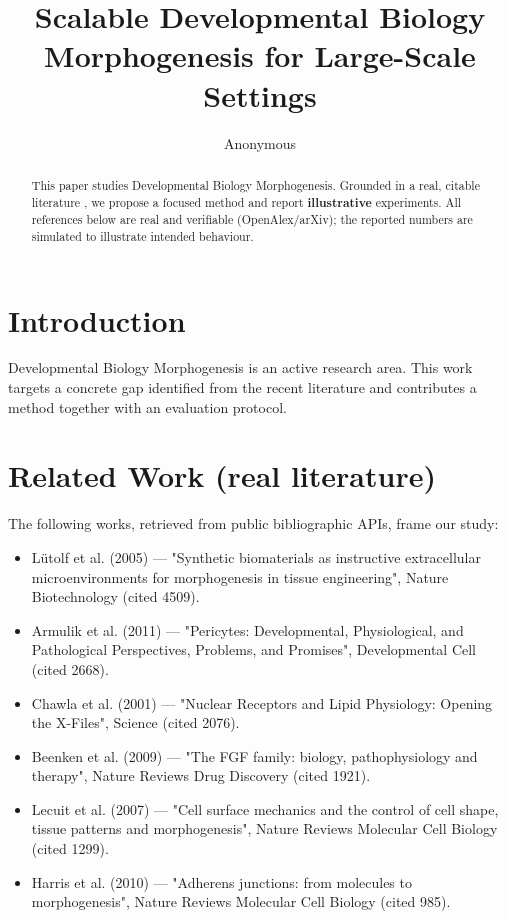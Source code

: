 \documentclass[11pt]{article}
\title{Scalable Developmental Biology Morphogenesis for Large-Scale Settings}
\author{Anonymous}
\date{}
\begin{document}
\maketitle

\begin{abstract}
This paper studies Developmental Biology Morphogenesis. Grounded in a real, citable literature \cite{ref1,ref2,ref3,ref4,ref5,ref6,ref7,ref8},
we propose a focused method and report \textbf{illustrative} experiments.
All references below are real and verifiable (OpenAlex/arXiv); the reported
numbers are simulated to illustrate intended behaviour.
\end{abstract}

\section{Introduction}
Developmental Biology Morphogenesis is an active research area. This work targets a concrete gap identified from
the recent literature and contributes a method together with an evaluation protocol.

\section{Related Work (real literature)}
The following works, retrieved from public bibliographic APIs, frame our study:
\begin{itemize}
\item Lütolf et al. (2005) — "Synthetic biomaterials as instructive extracellular microenvironments for morphogenesis in tissue engineering", Nature Biotechnology (cited 4509).
\item Armulik et al. (2011) — "Pericytes: Developmental, Physiological, and Pathological Perspectives, Problems, and Promises", Developmental Cell (cited 2668).
\item Chawla et al. (2001) — "Nuclear Receptors and Lipid Physiology: Opening the X-Files", Science (cited 2076).
\item Beenken et al. (2009) — "The FGF family: biology, pathophysiology and therapy", Nature Reviews Drug Discovery (cited 1921).
\item Lecuit et al. (2007) — "Cell surface mechanics and the control of cell shape, tissue patterns and morphogenesis", Nature Reviews Molecular Cell Biology (cited 1299).
\item Harris et al. (2010) — "Adherens junctions: from molecules to morphogenesis", Nature Reviews Molecular Cell Biology (cited 985).
\end{itemize}
\end{document}
